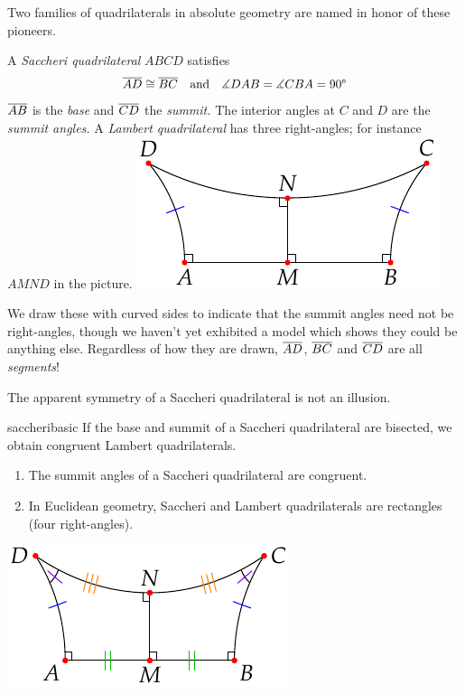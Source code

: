 
Two families of quadrilaterals in absolute geometry are named in honor of these pioneers.

\begin{defn}[lower separated=false, sidebyside, sidebyside align=top seam, sidebyside gap=0pt, righthand width=0.34\linewidth]{}{}
	A \emph{Saccheri quadrilateral} $ABCD$ satisfies
	\[
		\cl{AD}\cong\cl{BC}\quad\text{and}\quad \measuredangle DAB=\measuredangle CBA=\ang{90}
	\]
	$\cl{AB}$ is the \emph{base} and $\cl{CD}$ the \emph{summit.}\smallbreak
	The interior angles at $C$ and $D$ are the \emph{summit angles.}\medbreak
	A \emph{Lambert quadrilateral} has three right-angles; for instance $AMND$  in the picture.
	\tcblower
	\flushright\includegraphics{history-quad3}
\end{defn}

We draw these with curved sides to indicate that the summit angles need not be right-angles, though we haven't yet exhibited a model which shows they could be anything else. Regardless of how they are drawn, $\cl{AD}$, $\cl{BC}$ and $\cl{CD}$ are all \emph{segments}!
\goodbreak

The apparent symmetry of a Saccheri quadrilateral is not an illusion.

\begin{lemm}[lower separated=false, sidebyside, sidebyside align=top seam, sidebyside gap=0pt, righthand width=0.34\linewidth]{}{saccheribasic}
	\exstart If the base and summit of a Saccheri quadrilateral are bisected, we obtain congruent Lambert quadrilaterals.\vspace{-4pt}
	\begin{enumerate}\itemsep0pt\setcounter{enumi}{1}
	  \item The summit angles of a Saccheri quadrilateral are congruent.
		\item In Euclidean geometry, Saccheri and Lambert quadrilaterals are rectangles (four right-angles).
	\end{enumerate}
	\tcblower
	\flushright\includegraphics{history-quad4}
\end{lemm}

